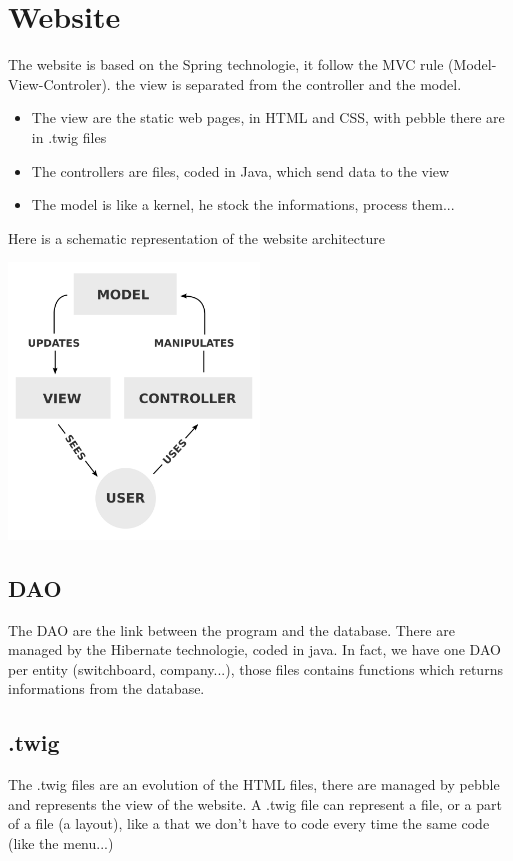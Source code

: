 \chapter{Website}

The website is based on the Spring technologie,  it follow the MVC rule (Model-View-Controler). the view is separated from the controller and the model.

\begin{itemize}  
\item The view are the static web pages, in HTML and CSS, with pebble there are in .twig files
\item The controllers are files, coded in Java, which send data to the view
\item The model is like a kernel, he stock the informations, process them...

\end{itemize}  

Here is a schematic representation of the website architecture

\includegraphics[width=0.50\textwidth]{img/mvc.png}



\section{DAO}

The DAO are the link between the program and the database. There are managed by the Hibernate technologie, coded in java.
In fact, we have one DAO per entity (switchboard, company...), those files contains functions which returns informations from the database.


\section{.twig}

The .twig files are an evolution of the HTML files, there are managed by pebble and represents the view of the website.
A .twig file can represent a file, or a part of a file (a layout), like a that we don't have to code every time the same code (like the menu...)